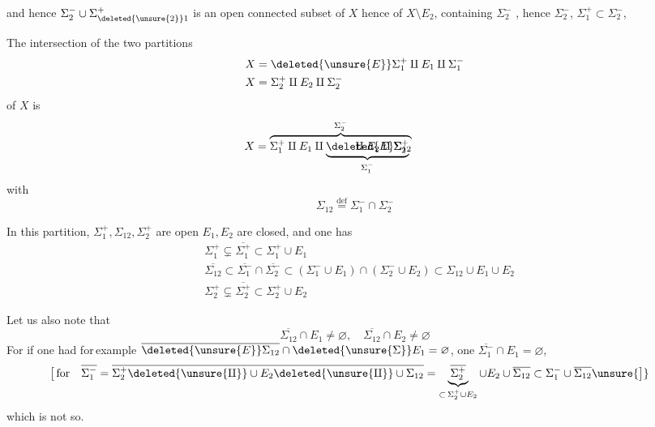 and hence $\Sigma_2^-\cup\Sigma_{\deleted{\unsure{2}}1}^+$  is an open connected subset of $X$ hence of $X\setminus E_2$, containing  $\Sigma_2^-$ , hence    $\Sigma_2^-$,  $\Sigma_1^+\subset\Sigma_2^-$, 

The intersection of the two partitions
\[
 \begin{aligned}
 X&=\deleted{\unsure{E}}\Sigma_1^+\amalg E_1\amalg\Sigma_1^-\\
 X&=\Sigma_2^+\amalg E_2\amalg\Sigma_2^-
 \end{aligned}
\]
of $X$ is
\[
 X=\overbrace{\Sigma_1^+\amalg E_1\amalg
 \rlap{$\displaystyle\underbrace{\phantom{E\Sigma_{12}}\amalg
 E_2\amalg\Sigma_2^+}_{\Sigma_1^-}$}\deleted{E}\Sigma_{12}}^{\Sigma_2^-}
 \phantom{\amalg E_2\amalg\Sigma_2^+}
\]
with
\[
 \Sigma_{12}\overset{\text{def}}{=}\Sigma_1^-\cap\Sigma_2^-
\]

In this partition, $\Sigma_1^+,\Sigma_{12},\Sigma_2^+$ are open $E_1,E_2$ are closed, and one has
\[
 \begin{aligned}
 &\Sigma_1^+\subsetneq\overline{\Sigma_1^+}\subset\Sigma_1^+\cup E_1\\
 &\overline{\Sigma_{12}}\subset\overline{\Sigma_1^-}\cap\overline{\Sigma_2^-}\subset
 (\Sigma_1^-\cup E_1)\cap(\Sigma_2^-\cup E_2)\subset\Sigma_{12}\cup E_1\cup E_2\\
 &\Sigma_2^+\subsetneq\overline{\Sigma_2^+}\subset\Sigma_2^+\cup E_2
 \end{aligned}
\]

Let us also note that
\[
 \overline{\Sigma_{12}}\cap E_1\ne\varnothing,\quad
 \overline{\Sigma_{12}}\cap E_2\ne\varnothing
\]
For if one had for\,example $\overline{\deleted{\unsure{E}}\Sigma_{12}}\cap
\deleted{\unsure{\Sigma}}E_1=\varnothing$, one 
 $\overline{\Sigma_1^-}\cap E_1=\varnothing$,
\[
 \begin{aligned}
 \big[\,\text{for}\quad\overline{\Sigma_1^-}&=
 \overline{\Sigma_2^+\deleted{\unsure{\amalg}}\cup E_2
 \deleted{\unsure{\amalg}}\cup\Sigma_{12}}=
 \underbrace{\overline{\Sigma_2^+}}_{\subset\,\Sigma_2^+\cup E_2}\cup E_2
 \cup\overline{\Sigma_{12}}\subset\Sigma_1^-\cup\overline{\Sigma_{12}}\unsure{\big]}
 \end{aligned}
\]
which is not so.

